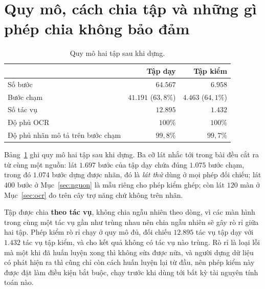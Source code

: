 \documentclass[12pt,a4paper,onecolumn]{article}
\newcommand{\ôvuông}[2]{\tikz[baseline=-0.45ex]{\draw[#1,line width=0.9pt,#2] (0,0) rectangle (0.34,0.18);}}
\newcommand{\bangchu}{\fontsize{10}{12}\selectfont}
\begin{document}
\section{Quy mô, cách chia tập và những gì phép chia không bảo đảm}

\begin{table}[t]
\centering{}\bangchu

\renewcommand{\arraystretch}{1.2}
\caption{Quy mô hai tập sau khi dựng.}
\label{tab:quymo}
\begin{tabular}{lrr}
\toprule
 & \textbf{Tập dạy} & \textbf{Tập kiểm} \\
\midrule
Số bước & $64.567$ & $6.958$ \\
Bước chạm & $41.191$ ($63{,}8\%$) & $4.463$ ($64{,}1\%$) \\
Số tác vụ & $12.895$ & $1.432$ \\
Độ phủ OCR & $100\%$ & $100\%$ \\
Độ phủ nhãn mô tả trên bước chạm & $99{,}8\%$ & $99{,}7\%$ \\
\bottomrule
\end{tabular}

\end{table}

Bảng~\ref{tab:quymo} ghi quy mô hai tập sau khi dựng. Ba cỡ lát nhắc tới trong bài đều cắt
ra từ cùng một nguồn: lát $1.697$ bước của tập dạy chứa đúng $1.075$ bước chạm, trong đó
$1.074$ bước dựng được nhãn, đó là \emph{lát thử} dùng ở mọi phép đối chiếu; lát
$400$ bước ở Mục~\ref{sec:nguon} là mẫu riêng cho phép kiểm ghép; còn lát $120$ màn ở
Mục~\ref{sec:ocr} đo trên cây trợ năng chứ không trên nhãn.

Tập được chia \textbf{theo tác vụ}, không chia ngẫu nhiên theo dòng, vì các màn hình
trong cùng một tác vụ gần như trùng nhau nên chia ngẫu nhiên sẽ gây rò rỉ giữa hai tập. Phép kiểm rò rỉ
chạy ở quy mô đủ, đối chiếu $12.895$ tác vụ tập dạy với $1.432$ tác vụ tập kiểm, và cho
kết quả không có tác vụ nào trùng. Rò rỉ là loại lỗi mà một khi đã huấn luyện xong thì
không sửa được nữa, và người dựng dữ liệu có phát hiện ra thì cũng chỉ còn cách huấn
luyện lại từ đầu, nên phép kiểm này được đặt làm điều kiện bắt buộc, chạy trước khi dùng tới bất kỳ tài nguyên tính toán
nào.
\end{document}
